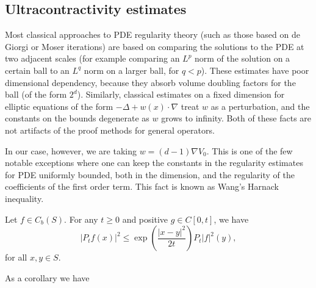 \subsection{Ultracontractivity estimates}

Most classical approaches to PDE regularity theory (such as those based on de Giorgi or Moser iterations) are based on comparing the solutions to the PDE at two adjacent scales (for example comparing an $L^p$ norm of the solution on a certain ball to an $L^q$ norm on a larger ball, for $q<p$). These estimates have poor dimensional dependency, because they absorb volume doubling factors for the ball (of the form $2^d$). Similarly, classical estimates on a fixed dimension for elliptic equations of the form $-\Delta + w(x) \cdot \nabla $ treat $w$ as a perturbation, and the constants on the bounds degenerate as $w$ grows to infinity. Both of these facts are not artifacts of the proof methods for general operators.

In our case, however, we are taking $w = (d-1)\nabla V_0$. This is one of the few notable exceptions where one can keep the constants in the regularity estimates for PDE uniformly bounded, both in the dimension, and the regularity of the coefficients of the first order term. This fact is known as Wang's Harnack inequality.

\begin{theorem} \label{thm:wangs_harnack}
    Let  \( f \in C_b(S) \). For any \( t \ge 0\) and positive \( g \in C[0,t] \), we have
    \[
        |P_t f(x)|^2 \le \exp\left(\frac{|x-y|^2}{2t}\right) P_t |f|^2(y),
    \]
    for all \( x,y \in S\).
\end{theorem}

As a corollary we have


